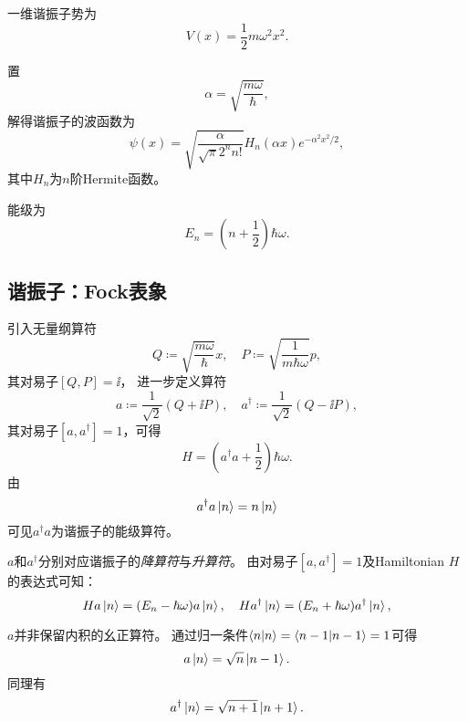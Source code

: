 一维谐振子势为
\begin{equation}
    V(x) = \frac12 m \omega^2 x^2.
\end{equation}

置
\begin{equation}
    \alpha = \sqrt{\frac{m\omega}{\hbar}},
\end{equation}
解得谐振子的波函数为
\begin{equation}
    \psi(x) = \sqrt{\frac{\alpha}{\sqrt\pi 2^n n!}} H_n(\alpha x) e^{-\alpha^2 x^2/2},
\end{equation}
其中$H_n$为$n$阶Hermite函数。

能级为
\begin{equation}
    E_n = (n + \frac12) \hbar \omega.
\end{equation}


\subsection{谐振子：Fock表象}

引入无量纲算符
\begin{equation}
    Q \coloneq \sqrt{\frac{m\omega}{\hbar}} x ,\quad P \coloneq \sqrt{\frac{1}{m\hbar\omega}} p,
\end{equation}
其对易子$[Q,P]=\ii$，
进一步定义算符
\begin{equation}
    a \coloneq \frac{1}{\sqrt{2}} (Q+\ii P) ,\quad a^\dag \coloneq \frac{1}{\sqrt{2}} (Q-\ii P),
\end{equation}
其对易子$[a,a^\dag]=1$，可得
\begin{equation}
    H = (a^\dag a + \frac12) \hbar\omega.
\end{equation}
由
\begin{equation}
    a^\dagger a \ket{n} = n \ket{n}
\end{equation}
可见$a^\dag a$为谐振子的能级算符。

$a$和$a^\dag$分别对应谐振子的\emph{降算符}与\emph{升算符}。
由对易子$[a,a^\dag]=1$及Hamiltonian $H$的表达式可知：
\begin{equation}
    H a \ket{n} = (E_n - \hbar\omega) a \ket{n},\quad H a^\dagger \ket{n} = (E_n + \hbar\omega) a^\dagger \ket{n},
\end{equation}

$a$并非保留内积的幺正算符。
通过归一条件$\braket{n}{n}=\braket{n-1}{n-1}=1$可得
\begin{equation}
    a\ket{n} = \sqrt{n}\ket{n-1}.
\end{equation}
同理有
\begin{equation}
    a^\dagger \ket{n} = \sqrt{n+1}\ket{n+1}.
\end{equation}
